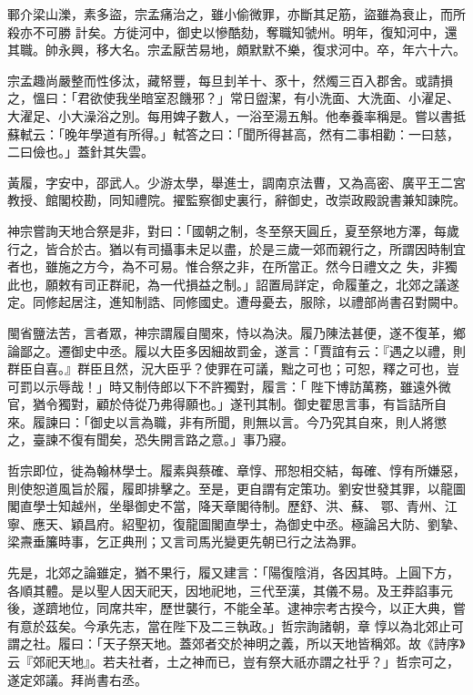 \begin{pinyinscope}
 鄆介梁山濼，素多盜，宗孟痛治之，雖小偷微罪，亦斷其足筋，盜雖為衰止，而所殺亦不可勝
 計矣。方徙河中，御史以慘酷劾，奪職知虢州。明年，復知河中，還其職。帥永興，移大名。宗孟厭苦易地，頗默默不樂，復求河中。卒，年六十六。



 宗孟趣尚嚴整而性侈汰，藏帑豐，每旦刲羊十、豕十，然燭三百入郡舍。或請損之，慍曰：「君欲使我坐暗室忍饑邪？」常日盥潔，有小洗面、大洗面、小濯足、大濯足、小大澡浴之別。每用婢子數人，一浴至湯五斛。他奉養率稱是。嘗以書抵蘇軾云：「晚年學道有所得。」軾答之曰：「聞所得甚高，然有二事相勸：一曰慈，
 二曰儉也。」蓋針其失雲。



 黃履，字安中，邵武人。少游太學，舉進士，調南京法曹，又為高密、廣平王二宮教授、館閣校勘，同知禮院。擢監察御史裏行，辭御史，改崇政殿說書兼知諫院。



 神宗嘗詢天地合祭是非，對曰：「國朝之制，冬至祭天圓丘，夏至祭地方澤，每歲行之，皆合於古。猶以有司攝事未足以盡，於是三歲一郊而親行之，所謂因時制宜者也，雖施之方今，為不可易。惟合祭之非，在所當正。然今日禮文之
 失，非獨此也，願敕有司正群祀，為一代損益之制。」詔置局詳定，命履董之，北郊之議遂定。同修起居注，進知制誥、同修國史。遭母憂去，服除，以禮部尚書召對闕中。



 閩省鹽法苦，言者眾，神宗謂履自閩來，恃以為決。履乃陳法甚便，遂不復革，鄉論鄙之。遷御史中丞。履以大臣多因細故罰金，遂言：「賈誼有云：『遇之以禮，則群臣自喜。』群臣且然，況大臣乎？使罪在可議，黜之可也；可恕，釋之可也，豈可罰以示辱哉！」時又制侍郎以下不許獨對，履言：「
 陛下博訪萬務，雖遠外微官，猶令獨對，顧於侍從乃弗得願也。」遂刊其制。御史翟思言事，有旨詰所自來。履諫曰：「御史以言為職，非有所聞，則無以言。今乃究其自來，則人將懲之，臺諫不復有聞矣，恐失開言路之意。」事乃寢。



 哲宗即位，徙為翰林學士。履素與蔡確、章惇、邢恕相交結，每確、惇有所嫌惡，則使恕道風旨於履，履即排擊之。至是，更自謂有定策功。劉安世發其罪，以龍圖閣直學士知越州，坐舉御史不當，降天章閣待制。歷舒、洪、蘇、
 鄂、青州、江寧、應天、穎昌府。紹聖初，復龍圖閣直學士，為御史中丞。極論呂大防、劉摯、梁燾垂簾時事，乞正典刑；又言司馬光變更先朝已行之法為罪。



 先是，北郊之論雖定，猶不果行，履又建言：「陽復陰消，各因其時。上圓下方，各順其體。是以聖人因天祀天，因地祀地，三代至漢，其儀不易。及王莽諂事元後，遂躋地位，同席共牢，歷世襲行，不能全革。逮神宗考古揆今，以正大典，嘗有意於茲矣。今承先志，當在陛下及二三執政。」哲宗詢諸朝，章
 惇以為北郊止可謂之社。履曰：「天子祭天地。蓋郊者交於神明之義，所以天地皆稱郊。故《詩序》云『郊祀天地』。若夫社者，土之神而已，豈有祭大祇亦謂之社乎？」哲宗可之，遂定郊議。拜尚書右丞。




\end{pinyinscope}
